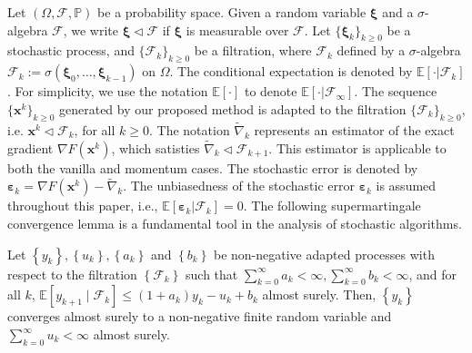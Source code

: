 \documentclass[twoside,11pt]{article}
\newcommand{\E}{\mathbb{E}}
\newcommand{\cF}{\mathcal F}
\newcommand{\wtnabla}{\widetilde\nabla}
\def\vx{{\bm{x}}}
\begin{document}
Let $(\Omega,\cF,\mathbb P)$ be a  probability space. Given a random variable ${\bm\xi}$ and a $\sigma$-algebra $\cF$, we write ${\bm\xi}\vartriangleleft\cF$ if ${\bm\xi}$ is measurable over $\cF$. {Let $\{{\bm\xi}_k\}_{k\geq0}$ be a stochastic process, and $\{\cF_k\}_{k\geq0}$ be a filtration, where $\cF_k$ defined by a $\sigma$-algebra $\cF_k:=\sigma(\bm\xi_0, \ldots, \bm\xi_{k-1}) $ on $\Omega$. The conditional expectation is denoted by $\E[\cdot|\cF_k]$.  For simplicity, we use the notation  $\E[\cdot]$ to denote $\E[\cdot|\cF_{\infty}]$. The sequence $\{\vx^k\}_{k\geq0}$ generated by our proposed method is adapted to the filtration $\{\cF_k\}_{k\geq0}$, i.e. $\vx^k\vartriangleleft\cF_k$, for all $k\geq0$. The notation $\wtnabla_k$ represents an estimator of the exact gradient $\nabla F(\vx^k)$, which satisties $\widetilde\nabla_k\vartriangleleft\cF_{k+1}$. This estimator is applicable to both the vanilla and momentum cases. The stochastic error is denoted by ${\bm\varepsilon}_k=\nabla F(\vx^k)-\wtnabla_k$. The unbiasedness of the stochastic error {$\bm{\varepsilon}_k$} is assumed throughout this paper, i.e., $\E[{\bm\varepsilon}_k|\cF_{k}]=0$.}
The following supermartingale convergence lemma is a fundamental tool in the analysis of stochastic algorithms.
\begin{lemma} \citep{robbins1951stochastic}
Let $\left\{y_k\right\},\left\{u_k\right\},\left\{a_k\right\}$ and $\left\{b_k\right\}$ be non-negative adapted processes with respect to the filtration $\left\{\mathcal{F}_k\right\}$ such that $\sum_{k=0}^\infty a_k<\infty, \sum_{k=0}^\infty b_k<\infty$, and for all $k$, $\mathbb{E}\left[y_{k+1} \mid \mathcal{F}_k\right] \leq\left(1+a_k\right) y_k-u_k+b_k$ almost surely. Then, $\left\{y_k\right\}$ converges almost surely to a non-negative finite random variable and $\sum_{k=0}^\infty u_k<\infty$ almost surely.
\label{martingale-convergence}
\end{lemma}
\end{document}
